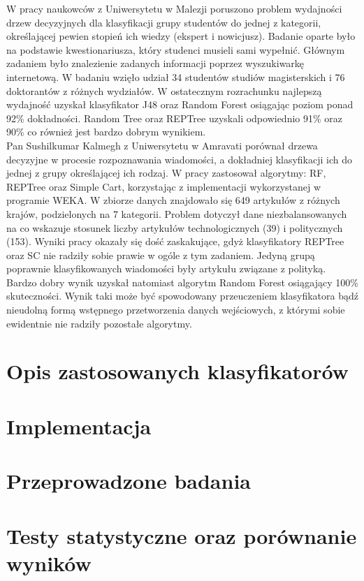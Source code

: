 \documentclass[conference]{IEEEtran}
\begin{document}
\indent W pracy naukowców z Uniwersytetu w Malezji poruszono problem wydajności drzew decyzyjnych dla klasyfikacji grupy studentów do jednej z kategorii, określającej pewien stopień ich wiedzy (ekspert i nowicjusz). Badanie oparte było na podstawie kwestionariusza, który studenci musieli sami wypełnić. Głównym zadaniem było znalezienie zadanych informacji poprzez wyszukiwarkę internetową. W badaniu wzięło udział 34 studentów studiów magisterskich i 76 doktorantów z różnych wydziałów. W ostatecznym rozrachunku najlepszą wydajność uzyskał klasyfikator J48 oraz Random Forest osiągając poziom ponad 92\% dokładności. Random Tree oraz REPTree uzyskali odpowiednio 91\% oraz 90\% co również jest bardzo dobrym wynikiem. \cite{b3} \\
\indent Pan Sushilkumar Kalmegh z Uniwersytetu w Amravati porównał drzewa decyzyjne w procesie rozpoznawania wiadomości, a dokładniej klasyfikacji ich do jednej z grupy określającej ich rodzaj. W pracy zastosował algorytmy: RF, REPTree oraz Simple Cart, korzystając z implementacji wykorzystanej w programie WEKA. W zbiorze danych znajdowało się 	649 artykułów z różnych krajów, podzielonych na 7 kategorii. Problem dotyczył dane niezbalansowanych na co wskazuje stosunek liczby artykułów technologicznych (39) i politycznych (153). Wyniki pracy okazały się dość zaskakujące, gdyż klasyfikatory REPTree oraz SC nie radziły sobie prawie w ogóle z tym zadaniem. Jedyną grupą poprawnie klasyfikowanych wiadomości były artykułu związane z polityką. Bardzo dobry wynik uzyskał natomiast algorytm Random Forest osiągający 100\% skuteczności. Wynik taki może być spowodowany przeuczeniem klasyfikatora bądź nieudolną formą wstępnego przetworzenia danych wejściowych, z którymi sobie ewidentnie nie radziły pozostałe algorytmy.
	
 

\section{Opis zastosowanych klasyfikatorów}

\section{Implementacja}

\section{Przeprowadzone badania}

\section{Testy statystyczne oraz porównanie wyników}
\end{document}
